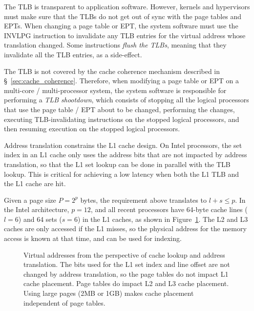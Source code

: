 The TLB is transparent to application software. However, kernels and
hypervisors must make sure that the TLBs do not get out of sync with the page
tables and EPTs. When changing a page table or EPT, the system software must
use the INVLPG instruction to invalidate any TLB entries for the virtual
address whose translation changed. Some instructions \textit{flush the TLBs},
meaning that they invalidate all the TLB entries, as a side-effect.


The TLB is not covered by the cache coherence mechanism described in
\S~\ref{sec:cache_coherence}. Therefore, when modifying a page table or EPT on
a multi-core / multi-processor system, the system software is responsible for
performing a \textit{TLB shootdown}, which consists of stopping all the logical
processors that use the page table / EPT about to be changed, performing the
changes, executing TLB-invalidating instructions on the stopped logical
processors, and then resuming execution on the stopped logical processors.

Address translation constrains the L1 cache design. On Intel processors, the
set index in an L1 cache only uses the address bits that are not impacted by
address translation, so that the L1 set lookup can be done in parallel with the
TLB lookup. This is critical for achieving a low latency when both the L1 TLB
and the L1 cache are hit.

Given a page size $P = 2^{p}$ bytes, the requirement
above translates to $l + s \le p$. In the Intel architecture, $p = 12$, and all
recent processors have 64-byte cache lines ($l = 6$) and 64 sets ($s = 6$) in
the L1 caches, as shown in Figure~\ref{fig:caching_and_paging}.
The L2 and L3 caches are only accessed if the L1 misses, so the physical
address for the memory access is known at that time, and can be used for
indexing.

\begin{figure}[hbt]
  \caption{
    Virtual addresses from the perspective of cache lookup and address
    translation. The bits used for the L1 set index and line offset are not
    changed by address translation, so the page tables do not impact L1 cache
    placement. Page tables do impact L2 and L3 cache placement. Using large
    pages (2MB or 1GB) makes cache placement independent of page tables.
  }
  \label{fig:caching_and_paging}
\end{figure}


